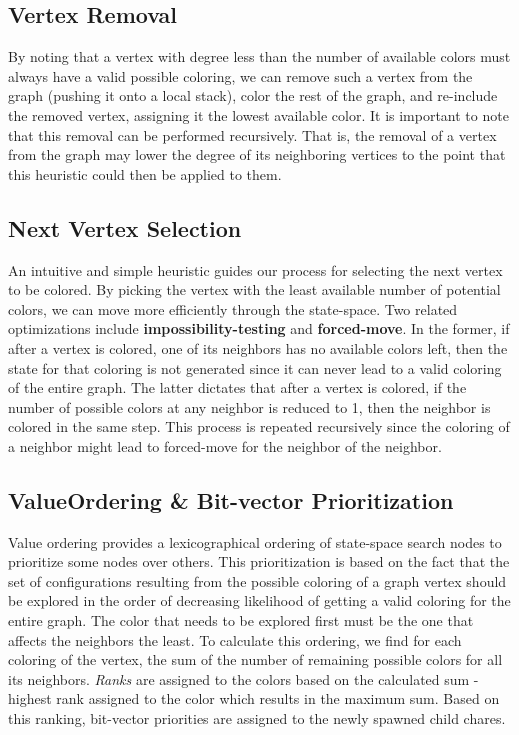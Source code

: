 \documentclass[10pt,oneside]{article}
\begin{document}
 \subsection{Vertex Removal}         
            By noting that a vertex with degree less than the number of available colors must
            always have a valid possible coloring, we can remove such a vertex
            from the graph (pushing it onto a local stack), color the rest of the graph, 
            and re-include the removed vertex, assigning it the lowest available color.
            It is important to note that this removal can be performed
            recursively. That is, the removal of a vertex from the graph may
            lower the degree of its neighboring vertices to the point that this
            heuristic could then be applied to them. 
            
\subsection{Next Vertex Selection}
            An intuitive and simple heuristic guides our process for selecting
            the next vertex to be colored. By picking the vertex with the least
            available number of potential colors, we can move more efficiently through the 
            state-space. Two related optimizations include \textbf{impossibility-testing} 
            and \textbf{forced-move}. In the former, if
            after a vertex is colored, one of its neighbors has no available
            colors left, then the state for that coloring is not generated since it can never lead to a valid 
            coloring of the entire graph. The
            latter dictates that after a vertex is colored, if the number of possible
            colors at any neighbor is reduced to 1, then the neighbor is colored in the 
            same step. This process is repeated recursively since the coloring of a
            neighbor might lead to forced-move for the neighbor of the neighbor.

  
\subsection{ValueOrdering \& Bit-vector Prioritization}   
\label{sec:bitvector}
            Value ordering provides a lexicographical ordering of state-space search nodes to
            prioritize some nodes over others. This prioritization is based
            on the fact that the set of configurations resulting from the possible coloring of a 
            graph vertex should be explored in the order of decreasing likelihood of getting a valid coloring for
            the entire graph. The color that needs to be explored first must be the one that affects the neighbors the least.
            To calculate this ordering, we find for each coloring of the vertex, the sum of the number of remaining possible 		   colors for all its neighbors. \emph{Ranks} are assigned to the colors based on the calculated sum - highest rank 		   assigned to the color which results in the maximum sum. Based on this ranking, bit-vector priorities are assigned
            to the newly spawned child chares.
           
\end{document}
